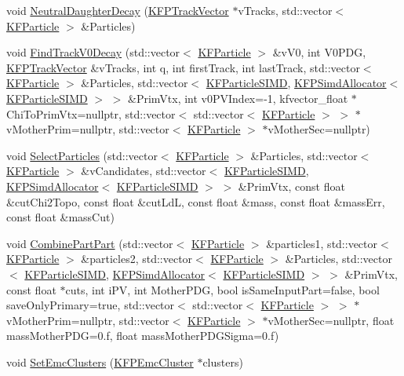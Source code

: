\begin{DoxyCompactItemize}
\item 
void \hyperlink{classKFParticleFinder_a76e093479fb04d0360e1cca0e6aa5d01}{Neutral\+Daughter\+Decay} (\hyperlink{classKFPTrackVector}{K\+F\+P\+Track\+Vector} $\ast$v\+Tracks, std\+::vector$<$ \hyperlink{classKFParticle}{K\+F\+Particle} $>$ \&Particles)
\item 
void \hyperlink{classKFParticleFinder_a5b475263eee7da03e48fb1c506cd8eeb}{Find\+Track\+V0\+Decay} (std\+::vector$<$ \hyperlink{classKFParticle}{K\+F\+Particle} $>$ \&v\+V0, int V0\+P\+DG, \hyperlink{classKFPTrackVector}{K\+F\+P\+Track\+Vector} \&v\+Tracks, int q, int first\+Track, int last\+Track, std\+::vector$<$ \hyperlink{classKFParticle}{K\+F\+Particle} $>$ \&Particles, std\+::vector$<$ \hyperlink{classKFParticleSIMD}{K\+F\+Particle\+S\+I\+MD}, \hyperlink{classKFPSimdAllocator}{K\+F\+P\+Simd\+Allocator}$<$ \hyperlink{classKFParticleSIMD}{K\+F\+Particle\+S\+I\+MD} $>$ $>$ \&Prim\+Vtx, int v0\+P\+V\+Index=-\/1, kfvector\+\_\+float $\ast$Chi\+To\+Prim\+Vtx=nullptr, std\+::vector$<$ std\+::vector$<$ \hyperlink{classKFParticle}{K\+F\+Particle} $>$ $>$ $\ast$v\+Mother\+Prim=nullptr, std\+::vector$<$ \hyperlink{classKFParticle}{K\+F\+Particle} $>$ $\ast$v\+Mother\+Sec=nullptr)
\item 
void \hyperlink{classKFParticleFinder_a179059d24166483347104b74e9ad6b48}{Select\+Particles} (std\+::vector$<$ \hyperlink{classKFParticle}{K\+F\+Particle} $>$ \&Particles, std\+::vector$<$ \hyperlink{classKFParticle}{K\+F\+Particle} $>$ \&v\+Candidates, std\+::vector$<$ \hyperlink{classKFParticleSIMD}{K\+F\+Particle\+S\+I\+MD}, \hyperlink{classKFPSimdAllocator}{K\+F\+P\+Simd\+Allocator}$<$ \hyperlink{classKFParticleSIMD}{K\+F\+Particle\+S\+I\+MD} $>$ $>$ \&Prim\+Vtx, const float \&cut\+Chi2\+Topo, const float \&cut\+LdL, const float \&mass, const float \&mass\+Err, const float \&mass\+Cut)
\item 
void \hyperlink{classKFParticleFinder_aafc7f2af67337b5434599250e898886f}{Combine\+Part\+Part} (std\+::vector$<$ \hyperlink{classKFParticle}{K\+F\+Particle} $>$ \&particles1, std\+::vector$<$ \hyperlink{classKFParticle}{K\+F\+Particle} $>$ \&particles2, std\+::vector$<$ \hyperlink{classKFParticle}{K\+F\+Particle} $>$ \&Particles, std\+::vector$<$ \hyperlink{classKFParticleSIMD}{K\+F\+Particle\+S\+I\+MD}, \hyperlink{classKFPSimdAllocator}{K\+F\+P\+Simd\+Allocator}$<$ \hyperlink{classKFParticleSIMD}{K\+F\+Particle\+S\+I\+MD} $>$ $>$ \&Prim\+Vtx, const float $\ast$cuts, int i\+PV, int Mother\+P\+DG, bool is\+Same\+Input\+Part=false, bool save\+Only\+Primary=true, std\+::vector$<$ std\+::vector$<$ \hyperlink{classKFParticle}{K\+F\+Particle} $>$ $>$ $\ast$v\+Mother\+Prim=nullptr, std\+::vector$<$ \hyperlink{classKFParticle}{K\+F\+Particle} $>$ $\ast$v\+Mother\+Sec=nullptr, float mass\+Mother\+P\+DG=0.f, float mass\+Mother\+P\+D\+G\+Sigma=0.f)
\item 
void \hyperlink{classKFParticleFinder_a81022e8eb9992d9b4ab4ba2687ea2b6c}{Set\+Emc\+Clusters} (\hyperlink{classKFPEmcCluster}{K\+F\+P\+Emc\+Cluster} $\ast$clusters)\hypertarget{classKFParticleFinder_a81022e8eb9992d9b4ab4ba2687ea2b6c}{}\label{classKFParticleFinder_a81022e8eb9992d9b4ab4ba2687ea2b6c}


\end{DoxyCompactItemize}
